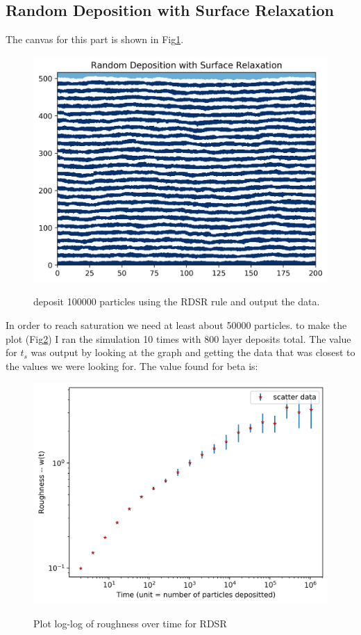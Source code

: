 \documentclass[12pt]{article}
\begin{document}
	\subsection{Random Deposition with Surface Relaxation}
	The canvas for this part is shown in Fig\ref{fig:RDSR}.
	\begin{figure}[h!]
		\centering
		\includegraphics[width=.9\linewidth]{../P5/canvas.jpg}
		\label{fig:RDSR}
		\caption{deposit 100000 particles using the RDSR rule and output the data.}
	\end{figure}
	In order to reach saturation we need
	at least about 50000 particles. to make the plot (Fig\ref{fig:RDSRplot}) I ran the simulation 10 times with 800
	layer deposits total. The value for $t_s$ was output by looking at the graph and getting
	the data that was closest to the values we were looking for.
	The value found for beta is:
	\begin{figure}[h!]
		\centering
		\includegraphics[width=0.9\linewidth]{../P5/plot_for_beta.jpg}
		\label{fig:RDSRplot}
		\caption{Plot log-log of roughness over time for RDSR}
	\end{figure}
\end{document}
